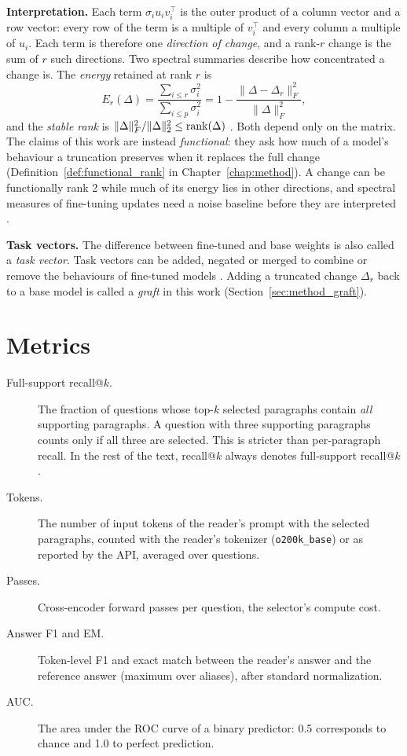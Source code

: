 \textbf{Interpretation.} Each term $\sigma_i u_i v_i^\top$ is the outer product of a column vector and a row vector: every row of the term is a multiple of $v_i^\top$ and every column a multiple of $u_i$. Each term is therefore one \emph{direction of change}, and a rank-$r$ change is the sum of $r$ such directions. Two spectral summaries describe how concentrated a change is. The \emph{energy} retained at rank $r$ is
\begin{equation}
E_r(\Delta)=\frac{\sum_{i\le r}\sigma_i^2}{\sum_{i\le p}\sigma_i^2}=1-\frac{\|\Delta-\Delta_r\|_F^2}{\|\Delta\|_F^2},
\end{equation}
and the \emph{stable rank} is $\|\Delta\|_F^2/\|\Delta\|_2^2\le\operatorname{rank}(\Delta)$ \cite{rudelson2007sampling}. Both depend only on the matrix. The claims of this work are instead \emph{functional}: they ask how much of a model's behaviour a truncation preserves when it replaces the full change (Definition~\ref{def:functional_rank} in Chapter~\ref{chap:method}). A change can be functionally rank 2 while much of its energy lies in other directions, and spectral measures of fine-tuning updates need a noise baseline before they are interpreted \cite{altaf2026noisebaseline}.

\textbf{Task vectors.} The difference between fine-tuned and base weights is also called a \emph{task vector}. Task vectors can be added, negated or merged to combine or remove the behaviours of fine-tuned models \cite{ilharco2023taskarithmetic,yadav2023ties}. Adding a truncated change $\Delta_r$ back to a base model is called a \emph{graft} in this work (Section~\ref{sec:method_graft}).

\section{Metrics}
\label{sec:bg_metrics}

\begin{description}
  \item[Full-support recall@$k$.] The fraction of questions whose top-$k$ selected paragraphs contain \emph{all} supporting paragraphs. A question with three supporting paragraphs counts only if all three are selected. This is stricter than per-paragraph recall. In the rest of the text, recall@$k$ always denotes full-support recall@$k$.
  \item[Tokens.] The number of input tokens of the reader's prompt with the selected paragraphs, counted with the reader's tokenizer (\texttt{o200k\_base}) or as reported by the API, averaged over questions.
  \item[Passes.] Cross-encoder forward passes per question, the selector's compute cost.
  \item[Answer F1 and EM.] Token-level F1 and exact match between the reader's answer and the reference answer (maximum over aliases), after standard normalization.
  \item[AUC.] The area under the ROC curve of a binary predictor: 0.5 corresponds to chance and 1.0 to perfect prediction.
\end{description}

